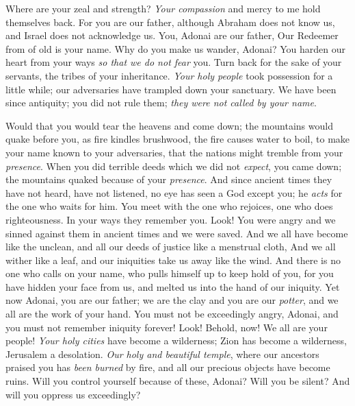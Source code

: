 \begin{biblechapter}
Where are your zeal and strength? 
\textit{Your compassion} and mercy to me hold themselves back.
\verse For you are our father, although Abraham does not know us, 
and Israel does not acknowledge us. 
You, Adonai are our father, 
Our Redeemer from of old is your name.
\verse Why do you make us wander, Adonai? 
You harden our heart from your ways \textit{so that we do not fear} you. 
Turn back for the sake of your servants, 
the tribes of your inheritance.
\verse \textit{Your holy people} took possession for a little while; 
our adversaries have trampled down your sanctuary.
\verse We have been since antiquity; you did not rule them; 
\textit{they were not called by your name}.
\end{biblechapter}

\begin{biblechapter} %
\verse  Would that you would tear the heavens and come down; 
the mountains would quake before you,
\verse  as fire kindles brushwood, 
the fire causes water to boil, 
to make your name known to your adversaries, 
that the nations might tremble from your \textit{presence}.
\verse When you did terrible deeds which we did not \textit{expect}, you came down; 
the mountains quaked because of your \textit{presence}.
\verse And since ancient times they have not heard, 
have not listened, 
no eye has seen a God except you; 
he \textit{acts} for the one who waits for him.
\verse You meet with the one who rejoices, 
one who does righteousness. 
In your ways they remember you. 
Look! You were angry and we sinned against them in ancient times and we were saved.
\verse And we all have become like the unclean, 
and all our deeds of justice like a menstrual cloth, 
And we all wither like a leaf, 
and our iniquities take us away like the wind.
\verse And there is no one who calls on your name, 
who pulls himself up to keep hold of you, 
for you have hidden your face from us, 
and melted us into the hand of our iniquity.
\verse Yet now Adonai, you are our father; 
we are the clay and you are our \textit{potter}, 
and we all are the work of your hand.
\verse You must not be exceedingly angry, Adonai, 
and you must not remember iniquity forever! Look! Behold, now! We all are your people!
\verse \textit{Your holy cities} have become a wilderness; 
Zion has become a wilderness, Jerusalem a desolation.
\verse \textit{Our holy and beautiful temple}, where our ancestors praised you has \textit{been burned} by fire, 
and all our precious objects have become ruins.
\verse Will you control yourself because of these, Adonai? 
Will you be silent? 
And will you oppress us exceedingly?
\end{biblechapter}

